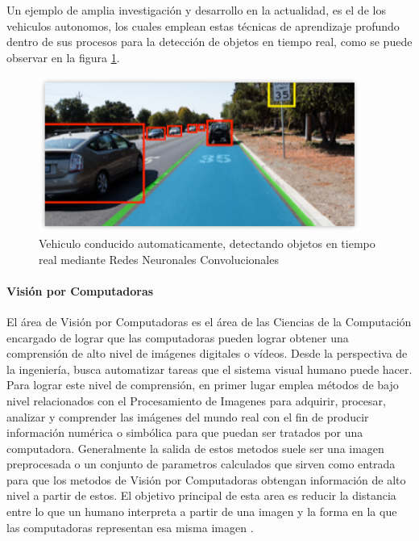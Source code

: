 \documentclass[a4paper,11pt,spanish]{book}
\begin{document}
      Un ejemplo de amplia investigación y desarrollo en la actualidad, es el de los vehiculos autonomos,
      los cuales emplean estas técnicas de aprendizaje profundo dentro de sus procesos para la detección de objetos en tiempo real, como se puede observar en la figura \ref{fig:car_detection}.

      \begin{figure}[h]
	\includegraphics[width=0.9\linewidth]{./img/nvidia_car_detection.png}
	\caption{Vehiculo conducido automaticamente, detectando objetos en tiempo real mediante Redes Neuronales Convolucionales}
	\label{fig:car_detection}
      \end{figure}

    \paragraph{Visión por Computadoras}
      El área de Visión por Computadoras es el área de las Ciencias de la Computación encargado de lograr que las computadoras pueden lograr obtener una comprensión de alto nivel de imágenes digitales o vídeos.
      Desde la perspectiva de la ingeniería, busca automatizar tareas que el sistema visual humano puede hacer. Para lograr este nivel de comprensión, en primer lugar emplea métodos de bajo nivel relacionados
      con el Procesamiento de Imagenes para adquirir, procesar, analizar y comprender las imágenes del mundo real con el fin de producir información numérica o simbólica para que
      puedan ser tratados por una computadora. Generalmente la salida de estos metodos suele ser una imagen preprocesada o un conjunto de parametros calculados que sirven como entrada
      para que los metodos de Visión por Computadoras obtengan información de alto nivel a partir de estos.
      El objetivo principal de esta area es reducir la distancia
      entre lo que un humano interpreta a partir de una imagen y la forma en la que las computadoras representan esa misma imagen \cite{Szeliski:ComputerVision}.
\end{document}
